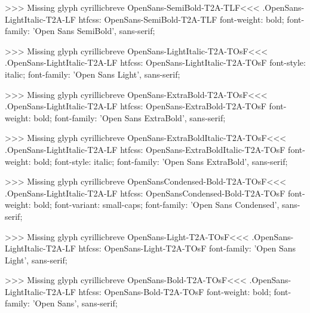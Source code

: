 >>>
Missing glyph	cyrillicbreve
\<OpenSans-SemiBold-T2A-TLF\><<<
.OpenSans-LightItalic-T2A-LF
htfcss:  OpenSans-SemiBold-T2A-TLF  font-weight: bold; font-family: 'Open Sans SemiBold', sans-serif;

>>>
Missing glyph	cyrillicbreve
\<OpenSans-LightItalic-T2A-TOsF\><<<
.OpenSans-LightItalic-T2A-LF
htfcss:  OpenSans-LightItalic-T2A-TOsF  font-style: italic; font-family: 'Open Sans Light', sans-serif;

>>>
Missing glyph	cyrillicbreve
\<OpenSans-ExtraBold-T2A-TOsF\><<<
.OpenSans-LightItalic-T2A-LF
htfcss:  OpenSans-ExtraBold-T2A-TOsF  font-weight: bold; font-family: 'Open Sans ExtraBold', sans-serif;

>>>
Missing glyph	cyrillicbreve
\<OpenSans-ExtraBoldItalic-T2A-TOsF\><<<
.OpenSans-LightItalic-T2A-LF
htfcss:  OpenSans-ExtraBoldItalic-T2A-TOsF  font-weight: bold; font-style: italic; font-family: 'Open Sans ExtraBold', sans-serif;

>>>
Missing glyph	cyrillicbreve
\<OpenSansCondensed-Bold-T2A-TOsF\><<<
.OpenSans-LightItalic-T2A-LF
htfcss:  OpenSansCondensed-Bold-T2A-TOsF  font-weight: bold; font-variant: small-caps; font-family: 'Open Sans Condensed', sans-serif;

>>>
Missing glyph	cyrillicbreve
\<OpenSans-Light-T2A-TOsF\><<<
.OpenSans-LightItalic-T2A-LF
htfcss:  OpenSans-Light-T2A-TOsF  font-family: 'Open Sans Light', sans-serif;

>>>
Missing glyph	cyrillicbreve
\<OpenSans-Bold-T2A-TOsF\><<<
.OpenSans-LightItalic-T2A-LF
htfcss:  OpenSans-Bold-T2A-TOsF  font-weight: bold; font-family: 'Open Sans', sans-serif;

